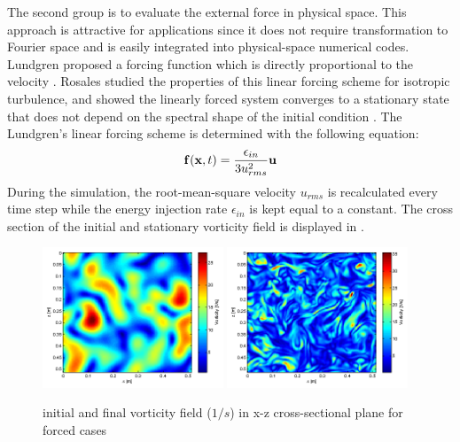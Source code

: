 The second group is to evaluate the external force in physical space. This approach is attractive for applications since it does not require transformation to Fourier space and is easily integrated into physical-space numerical codes. Lundgren proposed a forcing function which is directly proportional to the velocity \cite{Lundgren2003Linearly}. Rosales studied the properties of this linear forcing scheme for isotropic turbulence, and showed the linearly forced system converges to a stationary state that does not depend on the spectral shape of the initial condition \cite{Rosales2005Linear}. The Lundgren's linear forcing scheme is determined with the following equation:
\begin{equation}
\mathbf{f}(\mathbf{x}, t) = \frac{\epsilon_{in}}{3u_{rms}^2}\mathbf{u}
\end{equation}
During the simulation, the root-mean-square velocity $u_{rms}$ is recalculated every time step while the energy injection rate $\epsilon_{in}$ is kept equal to a constant.
The cross section of the initial and stationary vorticity field is displayed in .

\begin{figure}[h]\centering
\includegraphics[width=0.48\textwidth]{Figures/vortex-0}
\includegraphics[width=0.48\textwidth]{Figures/vortex-1}

\caption{initial and final vorticity field ($1/s$) in x-z cross-sectional
plane for forced cases\label{fig:vort}}
\end{figure}